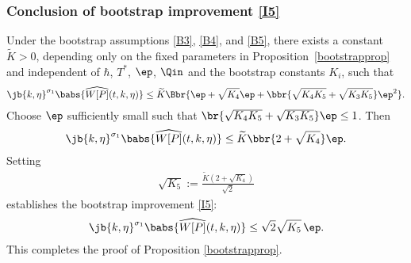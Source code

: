 \subsubsection*{Conclusion of bootstrap improvement \eqref{I5}}
Under the bootstrap assumptions \eqref{B3}, \eqref{B4}, and \eqref{B5}, there exists a constant $\widetilde K>0$, depending only on the fixed parameters in Proposition~\ref{bootstrapprop} and independent of $\hbar$, $T^*$, $\ep$, $\Qin$ and the bootstrap constants $K_i$, such that
\begin{align*}
\jb{k,\eta}^{\sigma_1}\babs{\widehat{W[P]}(t,k,\eta)}\leq \widetilde K\Bbr{\ep+\sqrt{K_4}\ep+\bbr{\sqrt{K_4K_5}+\sqrt{K_3K_5}}\ep^2}.
\end{align*}
Choose $\ep$ sufficiently small such that $\br{\sqrt{K_4K_5}+\sqrt{K_3K_5}}\ep\leq 1$. Then
\begin{align*}
\jb{k,\eta}^{\sigma_1}\babs{\widehat{W[P]}(t,k,\eta)}\leq \widetilde K\bbr{2+\sqrt{K_4}}\ep.
\end{align*}
Setting
\begin{align*}
\sqrt{K_5} := \frac{\widetilde{K} (2 + \sqrt{K_4})}{\sqrt{2}}
\end{align*}
establishes the bootstrap improvement \eqref{I5}:
\begin{align*}
\jb{k,\eta}^{\sigma_1} \babs{\widehat{W[P]}(t,k,\eta)}
\leq \sqrt{2} \sqrt{K_5}\, \ep.
\end{align*}
This completes the proof of Proposition \ref{bootstrapprop}.
